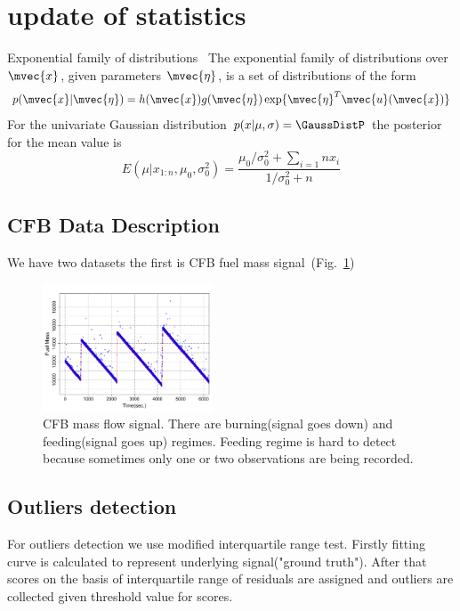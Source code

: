 \section{\Online update of statistics}
Exponential family of distributions~\cite{murphy2007conjugate}
The exponential family of distributions over $\mvec{x}$, given parameters $\mvec{\eta}$, is a set of distributions of the form
\begin{equation}
p(\mvec{x} | \mvec{\eta}) = h(\mvec{x}) g(\mvec{\eta}) \exp\{\mvec{\eta}^T \mvec{u}(\mvec{x})\}
\label{eq:exponential_family}
\end{equation}
For the univariate Gaussian distribution $p(x|\mu,\sigma) = \GaussDistP$ the posterior for the mean value is~\cite{Blei} 
\begin{equation}
 E(\mu | x_{1:n}, \mu_0, \sigma_0^2) = \frac{\mu_0 / \sigma_0^2 + \sum_{i=1}{n} x_i }{1/\sigma_0^2 + n}
\end{equation} 
%

\subsection{CFB Data Description}
\label{sec:datasecription}
We have two datasets the first is CFB fuel mass
signal~\cite{ZliobaiteBP09}(Fig.~\ref{fig:CFBsig1}) 
\begin{figure}[htb!]
    \center
    \includegraphics[width=0.45\textwidth]{pics/changeDetection/Part1DataA.pdf}
    \caption{CFB mass flow signal. There are burning(signal goes down) and
        feeding(signal goes up) regimes. Feeding regime is hard to detect because sometimes
        only one or two observations are being recorded.}
    \label{fig:CFBsig1}
\end{figure}


\subsection{Outliers detection}
For outliers detection we use modified interquartile range test.
Firstly fitting curve is calculated to represent underlying
signal("ground truth").  After that scores on the basis of
interquartile range of residuals are assigned and outliers are
collected given threshold value for scores.

